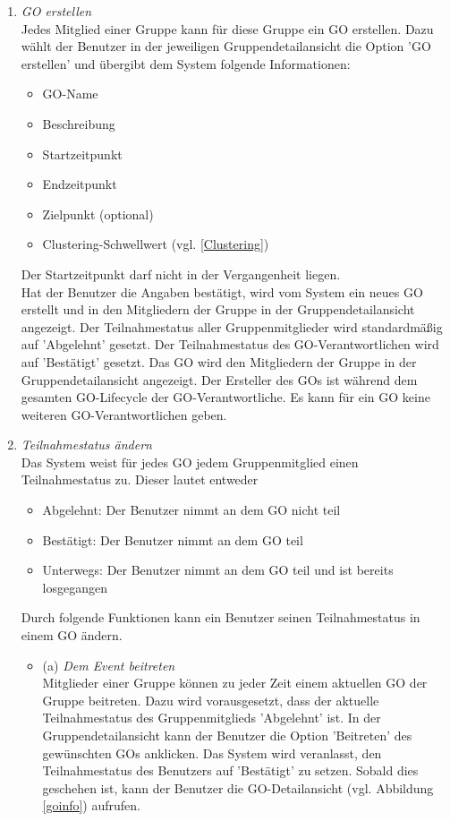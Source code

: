 \documentclass[parskip=full]{scrartcl}
\def\threedigits#1{%
  \ifnum#1<100 0\fi
  \ifnum#1<10 0\fi
  \number#1}
\begin{document}
\begin{enumerate}[label={\textbf{/F\protect\threedigits{\theenumi}0/}}, leftmargin=*, resume]
	\item \textit{GO erstellen}\label{GO erstellen} \\
	Jedes Mitglied einer Gruppe kann für diese Gruppe ein GO erstellen. Dazu wählt der Benutzer in der jeweiligen Gruppendetailansicht die Option 'GO erstellen' und übergibt dem System folgende Informationen:
	\begin{itemize}
		\item GO-Name
		\item \colorbox{shadecolor}{Beschreibung}
		\item Startzeitpunkt
		\item Endzeitpunkt 
		\item Zielpunkt (optional)
		\item \colorbox{shadecolor}{Clustering-Schwellwert (vgl. \ref{Clustering})}
	\end{itemize}
Der Startzeitpunkt darf nicht in der Vergangenheit liegen.\\
Hat der Benutzer die Angaben bestätigt, wird vom System ein neues GO erstellt und in den Mitgliedern der Gruppe in der Gruppendetailansicht angezeigt. Der Teilnahmestatus aller Gruppenmitglieder wird standardmäßig auf 'Abgelehnt' gesetzt. Der Teilnahmestatus des GO-Verantwortlichen wird auf 'Bestätigt' gesetzt.
Das GO wird den Mitgliedern der Gruppe in der Gruppendetailansicht angezeigt.
Der Ersteller des GOs ist während dem gesamten \gls{GO-Lifecycle} der GO-Verantwortliche. Es kann für ein GO keine weiteren GO-Verantwortlichen geben.
	\item \textit{Teilnahmestatus ändern}\label{Teilnahmestatus} \\
	Das System weist für jedes GO jedem Gruppenmitglied einen Teilnahmestatus zu. Dieser lautet entweder
	\begin{itemize}
		\item Abgelehnt: Der Benutzer nimmt an dem GO nicht teil
		\item Bestätigt: Der Benutzer nimmt an dem GO teil
		\item Unterwegs: Der Benutzer nimmt an dem GO teil und ist bereits losgegangen
	\end{itemize}
Durch folgende Funktionen kann ein Benutzer seinen Teilnahmestatus in einem GO ändern.

	\begin{itemize}
	\item (a) \textit{Dem Event beitreten} \label{GO-Anfrage} \\
	Mitglieder einer Gruppe können zu jeder Zeit einem aktuellen GO der Gruppe beitreten. Dazu wird vorausgesetzt, dass der aktuelle Teilnahmestatus des Gruppenmitglieds 'Abgelehnt' ist. In der Gruppendetailansicht kann der Benutzer die Option 'Beitreten' des gewünschten GOs anklicken. Das System wird  veranlasst, den Teilnahmestatus des Benutzers auf 'Bestätigt' zu setzen. Sobald dies geschehen ist, kann der Benutzer die GO-Detailansicht (vgl. Abbildung \ref{goinfo}) aufrufen.
	

\end{itemize}
\end{enumerate}
\end{document}
